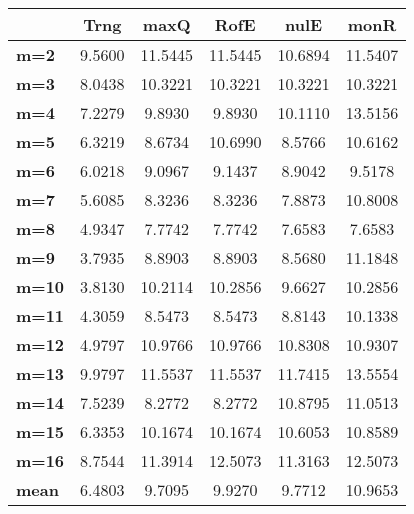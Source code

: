 \begin{tabular}{|l|c|c|c|c|c|}
\hline
&\textbf{Trng}&\textbf{maxQ}&\textbf{RofE}&\textbf{nulE}&\textbf{monR}\\\hline
\textbf{m=2}&9.5600&11.5445&11.5445&10.6894&11.5407\\\hline
\textbf{m=3}&8.0438&10.3221&10.3221&10.3221&10.3221\\\hline
\textbf{m=4}&7.2279&9.8930&9.8930&10.1110&13.5156\\\hline
\textbf{m=5}&6.3219&8.6734&10.6990&8.5766&10.6162\\\hline
\textbf{m=6}&6.0218&9.0967&9.1437&8.9042&9.5178\\\hline
\textbf{m=7}&5.6085&8.3236&8.3236&7.8873&10.8008\\\hline
\textbf{m=8}&4.9347&7.7742&7.7742&7.6583&7.6583\\\hline
\textbf{m=9}&3.7935&8.8903&8.8903&8.5680&11.1848\\\hline
\textbf{m=10}&3.8130&10.2114&10.2856&9.6627&10.2856\\\hline
\textbf{m=11}&4.3059&8.5473&8.5473&8.8143&10.1338\\\hline
\textbf{m=12}&4.9797&10.9766&10.9766&10.8308&10.9307\\\hline
\textbf{m=13}&9.9797&11.5537&11.5537&11.7415&13.5554\\\hline
\textbf{m=14}&7.5239&8.2772&8.2772&10.8795&11.0513\\\hline
\textbf{m=15}&6.3353&10.1674&10.1674&10.6053&10.8589\\\hline
\textbf{m=16}&8.7544&11.3914&12.5073&11.3163&12.5073\\\hline
\textbf{mean}&6.4803&9.7095&9.9270&9.7712&10.9653\\\hline
\end{tabular}
